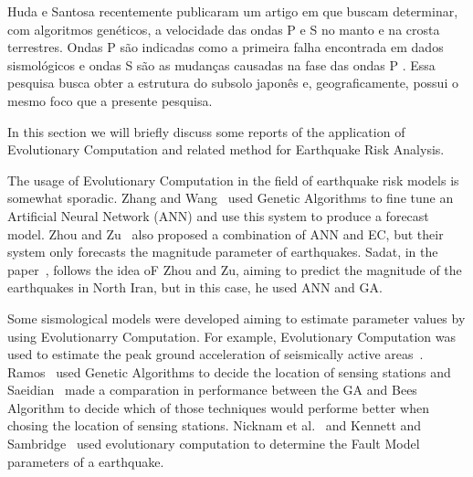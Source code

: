 Huda e Santosa \cite{ijse5762} recentemente publicaram um artigo em que buscam determinar, com algoritmos genéticos, a velocidade das ondas P e S no manto e na crosta terrestres. Ondas P são indicadas como a primeira falha encontrada em dados sismológicos e ondas S são as mudanças causadas na fase das ondas P \cite{ijse5762}. Essa pesquisa busca obter a estrutura do subsolo japonês e, geograficamente, possui o mesmo foco que a presente pesquisa.


In this section we will briefly discuss some reports of the
application of Evolutionary Computation and related method for
Earthquake Risk Analysis.

The usage of Evolutionary Computation in the field of earthquake risk
models is somewhat sporadic. Zhang and Wang~\cite{Zhang2012} used
Genetic Algorithms to fine tune an Artificial Neural Network (ANN) and
use this system to produce a forecast model. Zhou and
Zu~\cite{Feiyan2014} also proposed a combination of ANN and EC, but
their system only forecasts the magnitude parameter of
earthquakes. Sadat, in the paper~\cite{sadat2015application}, follows
the idea oF Zhou and Zu, aiming to predict the magnitude of the
earthquakes in North Iran, but in this case, he used ANN and GA.

Some sismological models were developed aiming to estimate parameter
values by using Evolutionarry Computation. For example, Evolutionary
Computation was used to estimate the peak ground acceleration of
seismically active
areas~\cite{Kermani2009,Cabalar2009,Kerh2010,Kerh2015}. Ramos~\cite{Ramos2011}
used Genetic Algorithms to decide the location of sensing stations and
Saeidian~\cite{saeidian2016evaluation} made a comparation in
performance between the GA and Bees Algorithm to decide which of those
techniques would performe better when chosing the location of sensing
stations. Nicknam et al.~\cite{Nicknam2010} and Kennett and
Sambridge~\cite{Kennett1992} used evolutionary computation to
determine the Fault Model parameters of a earthquake.




